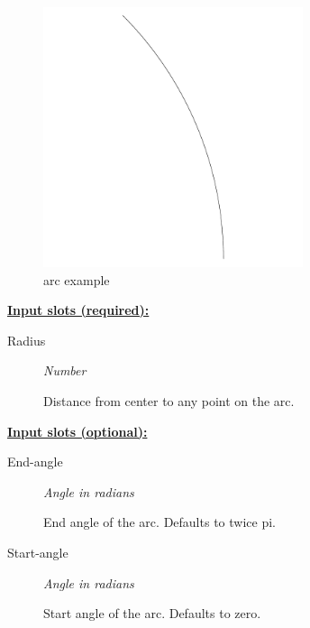 \documentclass [11pt]{book}
\begin{document}
\begin{itemize}
\begin{figure}
\begin{center}
\includegraphics[width=3in,height=3in]{../images/example-arc.pdf}
\end{center}

\caption{arc example}

\label{fig:arc}

\end{figure}





\textbf{
\underline{Input slots (required):}}

\begin{description}

\item [Radius]
\emph{Number}

 Distance from center to any point on the arc.




\end{description}






\textbf{
\underline{Input slots (optional):}}

\begin{description}

\item [End-angle]
\emph{Angle in radians}

 End angle of the arc. Defaults to twice pi.




\item [Start-angle]
\emph{Angle in radians}

 Start angle of the arc. Defaults to zero.





\end{description}
\end{itemize}
\end{document}
